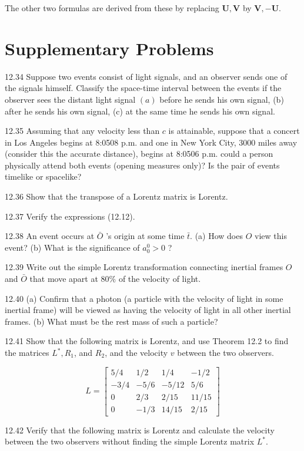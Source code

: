 \documentclass[10pt]{article}
\begin{document}
The other two formulas are derived from these by replacing $\mathbf{U}, \mathbf{V}$ by $\mathbf{V},-\mathbf{U}$.

\section*{Supplementary Problems}
12.34 Suppose two events consist of light signals, and an observer sends one of the signals himself. Classify the space-time interval between the events if the observer sees the distant light signal $(a)$ before he sends his own signal, (b) after he sends his own signal, (c) at the same time he sends his own signal.

12.35 Assuming that any velocity less than $c$ is attainable, suppose that a concert in Los Angeles begins at 8:0508 p.m. and one in New York City, 3000 miles away (consider this the accurate distance), begins at 8:0506 p.m. could a person physically attend both events (opening measures only)? Is the pair of events timelike or spacelike?

12.36 Show that the transpose of a Lorentz matrix is Lorentz.

12.37 Verify the expressions (12.12).

12.38 An event occurs at $\bar{O}$ 's origin at some time $\bar{t}$. (a) How does $O$ view this event? (b) What is the significance of $a_{0}^{0}>0$ ?

12.39 Write out the simple Lorentz transformation connecting inertial frames $O$ and $\bar{O}$ that move apart at $80 \%$ of the velocity of light.

12.40 (a) Confirm that a photon (a particle with the velocity of light in some inertial frame) will be viewed as having the velocity of light in all other inertial frames. (b) What must be the rest mass of such a particle?

12.41 Show that the following matrix is Lorentz, and use Theorem 12.2 to find the matrices $L^{*}, R_{1}$, and $R_{2}$, and the velocity $v$ between the two observers.

$$
L=\left[\begin{array}{crcr}
5 / 4 & 1 / 2 & 1 / 4 & -1 / 2 \\
-3 / 4 & -5 / 6 & -5 / 12 & 5 / 6 \\
0 & 2 / 3 & 2 / 15 & 11 / 15 \\
0 & -1 / 3 & 14 / 15 & 2 / 15
\end{array}\right]
$$

12.42 Verify that the following matrix is Lorentz and calculate the velocity between the two observers without finding the simple Lorentz matrix $L^{*}$.
\end{document}
